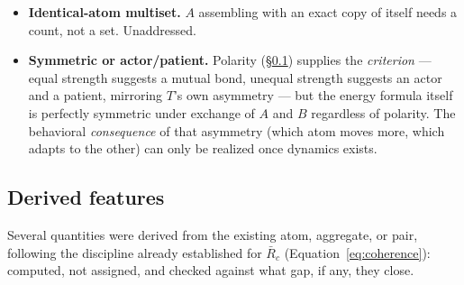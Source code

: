 \documentclass[12pt, a4paper]{article}
\begin{document}
\begin{itemize}
      honestly correct general statement: the lowest-energy pairing
      is the stablest, and other pairings are unstable and will
      dynamically move toward it; strongest-with-strongest is that
      stable destination only in the uniform-alignment special case,
      not in general.
\item \textbf{Identical-atom multiset.} $A$ assembling with an exact
      copy of itself needs a count, not a set. Unaddressed.
\item \textbf{Symmetric or actor/patient.} Polarity
      (\S\ref{subsec:assembly_features}) supplies the
      \emph{criterion} --- equal strength suggests a mutual bond,
      unequal strength suggests an actor and a patient, mirroring
      $T$'s own asymmetry --- but the energy formula itself is
      perfectly symmetric under exchange of $A$ and $B$ regardless
      of polarity. The behavioral \emph{consequence} of that
      asymmetry (which atom moves more, which adapts to the other)
      can only be realized once dynamics exists.
\end{itemize}


\subsection{Derived features}
\label{subsec:assembly_features}
Several quantities were derived from the existing atom, aggregate,
or pair, following the discipline already established for $\bar
R_c$ (Equation~\eqref{eq:coherence}): computed, not assigned, and
checked against what gap, if any, they close.
\end{document}
